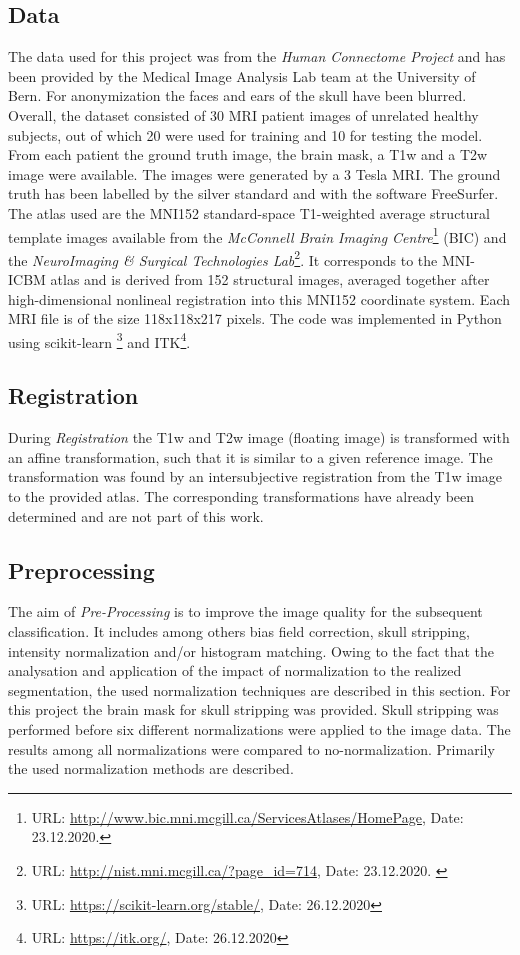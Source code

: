 \documentclass[journal]{IEEEtran}
\begin{document}
\subsection{Data}
	The data used for this project was from the {\itshape Human Connectome Project} and has been provided by the Medical Image Analysis Lab team at the University of Bern. For anonymization the faces and ears of the skull have been blurred. 
	Overall, the dataset consisted of 30 MRI patient images of unrelated healthy subjects, out of which 20 were used for training and 10 for testing the model. 
	From each patient the ground truth image, the brain mask, a T1w and a T2w image were available. The images were generated by a 3 Tesla MRI. 
	The ground truth has been labelled by the silver standard and with the software FreeSurfer.
	The atlas used are the MNI152 standard-space T1-weighted average structural template images available from the {\itshape McConnell Brain Imaging Centre}\footnote{URL: \url{http://www.bic.mni.mcgill.ca/ServicesAtlases/HomePage}, Date: 23.12.2020.} (BIC) and the {\itshape NeuroImaging \& Surgical Technologies Lab}\footnote{URL: \url{http://nist.mni.mcgill.ca/?page_id=714}, Date: 23.12.2020. \label{second}}. 
	It corresponds to the MNI-ICBM atlas and is derived from 152 structural images, averaged together after high-dimensional nonlineal registration into this MNI152 coordinate system.
	Each MRI file is of the size 118x118x217 pixels.\smallskip
	The code was implemented in Python using scikit-learn \footnote{URL: \url{https://scikit-learn.org/stable/}, Date: 26.12.2020} and ITK\footnote{URL: \url{https://itk.org/}, Date: 26.12.2020}.
		
\subsection{Registration}
	During {\itshape Registration} the T1w and T2w image (floating image) is transformed with an affine transformation, such that it is similar to a given reference image.
	The transformation was found by an intersubjective registration from the T1w image to the provided atlas. The corresponding transformations have already been determined
	and are not part of this work. 	
	
\subsection{Preprocessing}
	The aim of {\itshape Pre-Processing} is to improve the image quality for the subsequent classification. It includes among others bias field correction, skull stripping, intensity normalization and/or histogram matching.
	Owing to the fact that the analysation and application of the impact of normalization to the realized segmentation, the used normalization techniques are described in this section.
	For this project the brain mask for skull stripping was provided. Skull stripping was performed before six different normalizations were applied to the image data. The results among all normalizations were compared to no-normalization. Primarily the used normalization methods are described. \cite{normalizations} \smallskip
		
\end{document}
